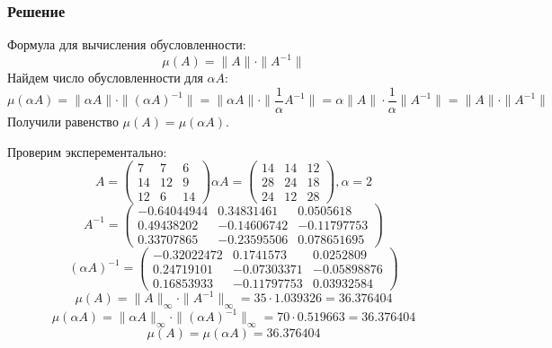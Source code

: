 \documentclass[14pt, a4paper]{extarticle}
\begin{document}
		\subsubsection{Решение}
		Формула для вычисления обусловленности: 
		\[ \mu(A) = \|A\|\cdot \|A^{-1}\|\]
		Найдем число обусловленности для $\alpha A$:
		\[ \mu(\alpha A) = \|\alpha A\| \cdot \|(\alpha A)^{-1}\| = \|\alpha A\| \cdot \|\dfrac{1}{\alpha} A^{-1}\| = \alpha \|A\| \cdot \dfrac{1}{\alpha} \|A^{-1}\| = \|A\|\cdot \|A^{-1}\| \]
		Получили равенство $\mu(A) = \mu(\alpha A)$.
		
		Проверим эксперементально:
		\[ A = \begin{pmatrix}
					7 & 7 & 6\\
					14 & 12 & 9\\
					12 & 6 & 14
				\end{pmatrix}
		\alpha A = \begin{pmatrix}
						14 & 14 & 12\\
						28 & 24 & 18\\
						24 & 12 & 28
					\end{pmatrix}, \alpha = 2
		\]
		\[A^{-1} = \begin{pmatrix}
						-0.64044944 & 0.34831461 & 0.0505618\\
						 0.49438202 & -0.14606742 & -0.11797753\\
						 0.33707865 & -0.23595506 &  0.078651695
					\end{pmatrix}
		\]
		\[(\alpha A)^{-1} = \begin{pmatrix}
			-0.32022472 & 0.1741573 & 0.0252809\\
			 0.24719101 & -0.07303371 & -0.05898876\\
			 0.16853933 & -0.11797753 & 0.03932584
		\end{pmatrix}
		\]
		\[ \mu(A) = \|A\|_{\infty} \cdot \|A^{-1}\|_{\infty} = 35 \cdot 1.039326 = 36.376404 \]
		\[ \mu(\alpha A) = \|\alpha A\|_{\infty} \cdot \|(\alpha A)^{-1}\|_{\infty} = 70 \cdot 0.519663 = 36.376404 \]
		\[ \mu(A) = \mu(\alpha A) = 36.376404 \]
\end{document}
